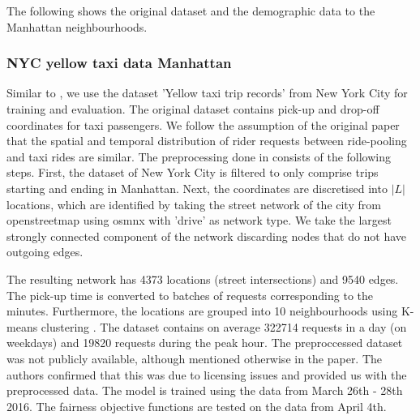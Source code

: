 The following shows the original dataset and the demographic data to the Manhattan neighbourhoods.

\subsubsection{NYC yellow taxi data Manhattan} \label{sec:NYC yellow taxi data}
Similar to \citet{raman21}, we use the dataset 'Yellow taxi trip records' from New York City \cite{ny16} for training and evaluation. The original dataset contains pick-up and drop-off coordinates for taxi passengers. We follow the assumption of the original paper that the spatial and temporal distribution of rider requests between ride-pooling and taxi rides are similar. The preprocessing done in \citet{raman21} consists of the following steps. First, the dataset of New York City is filtered to only comprise trips starting and ending in Manhattan. Next, the coordinates are discretised into $|L|$ locations, which are identified by taking the street network of the city from openstreetmap \cite{OpenStreetMap} using osmnx with 'drive' as network type. We take the largest strongly connected component of the network discarding nodes that do not have outgoing edges. 

The resulting network has 4373 locations (street intersections) and 9540 edges. The pick-up time is converted to batches of requests corresponding to the minutes. Furthermore, the locations are grouped into 10 neighbourhoods using K-means clustering \citep{lloyd1982least}. The dataset contains on average 322714 requests in a day (on weekdays) and 19820 requests during the peak hour. The preproccessed dataset was not publicly available, although mentioned otherwise in the paper. The authors confirmed that this was due to licensing issues and provided us with the preprocessed data. The model is trained using the data from March 26th - 28th 2016. The fairness objective functions are tested on the data from April 4th. 





